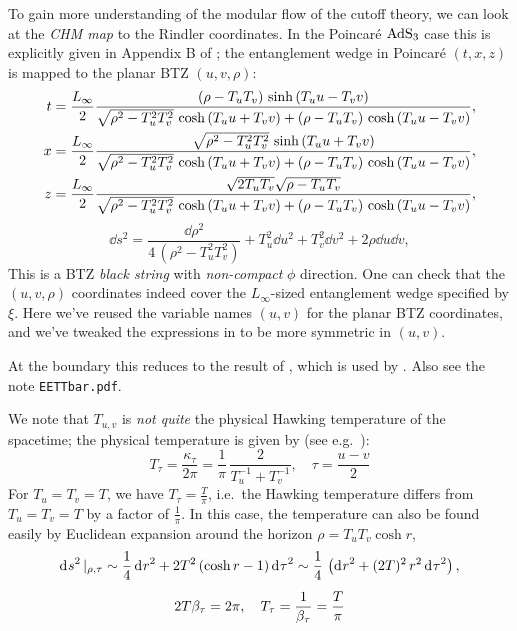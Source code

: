 \documentclass[11pt,a4paper,utf8]{article}
\begin{document}
	To gain more understanding of the modular flow of the cutoff theory, we can look at the \textit{CHM map} \cite{Casini:2011kv} to the Rindler coordinates. In the Poincar\'e $\mathrm{AdS}_3$ case this is explicitly given in Appendix B of \cite{Song:2016gtd}; the entanglement wedge in Poincar\'e $(t,x,z)$ is mapped to the planar BTZ $(u,v,\rho)$:
	\begin{equation}
	\begin{aligned}
		t &= \frac{L_\infty}{2} \frac{
				\left(\rho - T_u T_v\right)
				\,\sinh\,(T_u u - T_v v)
			}{
				\sqrt{\rho^2 - T_u^2 T_v^2}
					\,\cosh\,(T_u u + T_v v)
				+ \left(\rho - T_u T_v\right)
					\,\cosh\,(T_u u - T_v v)
			},
	\\
		x &= \frac{L_\infty}{2} \frac{
				\sqrt{\rho^2 - T_u^2 T_v^2}
				\,\sinh\,(T_u u + T_v v)
			}{
				\sqrt{\rho^2 - T_u^2 T_v^2}
					\,\cosh\,(T_u u + T_v v)
				+ \left(\rho - T_u T_v\right)
					\,\cosh\,(T_u u - T_v v)
			},
	\\
		z &= \frac{L_\infty}{2} \frac{
				\sqrt{2T_u T_v}
				\sqrt{\rho - T_u T_v}
			}{
				\sqrt{\rho^2 - T_u^2 T_v^2}
					\,\cosh\,(T_u u + T_v v)
				+ \left(\rho - T_u T_v\right)
					\,\cosh\,(T_u u - T_v v)
			},
	\end{aligned}
	\label{eq:poincare2btz}
	\end{equation}
	\begin{equation}
		\dd{s}^2
		= \frac{\dd{\rho}^2}{4\,(\rho^2 - T_u^2 T_v^2)}
			+ T_u^2 \dd{u}^2
			+ T_v^2 \dd{v}^2
			+ 2\rho \dd{u} \dd{v},
	\end{equation}
	This is a BTZ \textit{black string} with \textit{non-compact} $\phi$ direction. 
	One can check that the $(u,v,\rho)$ coordinates indeed cover the $L_\infty$-sized entanglement wedge specified by $\xi$. 
	Here we've reused the variable names $(u,v)$ for the planar BTZ coordinates, and we've tweaked the expressions in \cite{Song:2016gtd} to be more symmetric in $(u,v)$. 
	
	\noindent{} At the boundary this reduces to the result of \textcite{Casini:2011kv}, which is used by \textcite{Lewkowycz:2019xse}. Also see the note \texttt{EETTbar.pdf}. 
	
	We note that $T_{u,v}$ is \textit{not quite} the physical Hawking temperature of the spacetime; the physical temperature is given by (see e.g.~\cite{Compere:2018aar}):
	\begin{equation}
		T_\tau = \frac{\kappa_\tau}{2\pi}
		= \frac{1}{\pi}\,
			\frac{2}{T_u^{-1} + T_v^{-1}},
	\quad
		\tau = \frac{u - v}{2}
	\end{equation}
	For $T_u = T_v = T$, we have $T_\tau = \frac{T}{\pi}$, i.e.~the Hawking temperature differs from $T_u = T_v = T$ by a factor of $\frac{1}{\pi}$. In this case, the temperature can also be found easily by Euclidean expansion around the horizon $\rho = T_u T_v \cosh r$,
	\begin{gather}
		\mathinner{\mathrm{d}^{}s}^2|_{\rho,\tau}
		\sim \frac{1}{4} \mathinner{\mathrm{d}^{}r}^2
			+ 2T^2 \left(\cosh r - 1\right)
				\mathinner{\mathrm{d}^{}\tau}^2
		\sim \frac{1}{4}\,\left(
				\mathinner{\mathrm{d}^{}r}^2
				+ (2T)^2\,r^2 \mathinner{\mathrm{d}^{}\tau}^2
			\right),
	\\[1ex]
		2T\beta_\tau = 2\pi,
	\quad
		T_\tau = \frac{1}{\beta_\tau} = \frac{T}{\pi}
	\end{gather}
	
\end{document}
